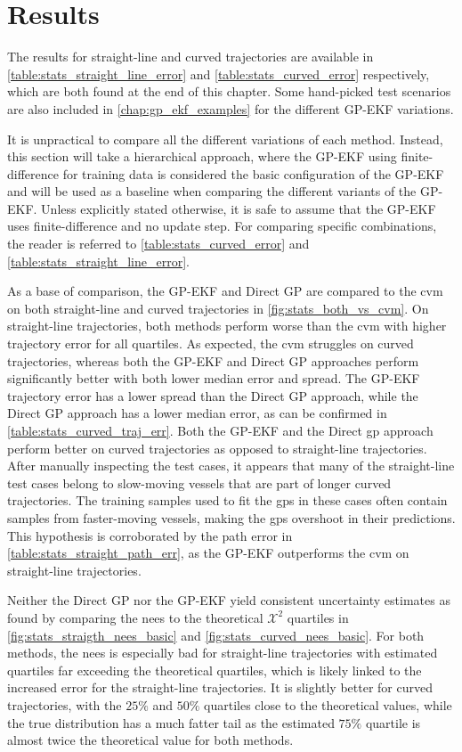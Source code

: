 \section{Results}
The results for straight-line and curved trajectories are available in \cref{table:stats_straight_line_error} and \cref{table:stats_curved_error} respectively, which are both found at the end of this chapter. Some hand-picked test scenarios are also included in \cref{chap:gp_ekf_examples} for the different GP-EKF variations.

It is unpractical to compare all the different variations of each method. Instead, this section will take a hierarchical approach, where the GP-EKF using finite-difference for training data is considered the basic configuration of the GP-EKF and will be used as a baseline when comparing the different variants of the GP-EKF. Unless explicitly stated otherwise, it is safe to assume that the GP-EKF uses finite-difference and no update step. For comparing specific combinations, the reader is referred to \cref{table:stats_curved_error} and \cref{table:stats_straight_line_error}.

As a base of comparison, the GP-EKF and Direct GP are compared to the \acrshort{cvm} on both straight-line and curved trajectories in \cref{fig:stats_both_vs_cvm}. On straight-line trajectories, both methods perform worse than the \acrshort{cvm} with higher trajectory error for all quartiles. As expected, the \acrshort{cvm} struggles on curved trajectories, whereas both the GP-EKF and Direct GP approaches perform significantly better with both lower median error and spread. The GP-EKF trajectory error has a lower spread than the Direct GP approach, while the Direct GP approach has a lower median error, as can be confirmed in \cref{table:stats_curved_traj_err}. Both the GP-EKF and the Direct \acrshort{gp} approach perform better on curved trajectories as opposed to straight-line trajectories. After manually inspecting the test cases, it appears that many of the straight-line test cases belong to slow-moving vessels that are part of longer curved trajectories.  The training samples used to fit the \acrshort{gp}s in these cases often contain samples from faster-moving vessels, making the \acrshort{gp}s overshoot in their predictions. This hypothesis is corroborated by the path error in \cref{table:stats_straight_path_err}, as the GP-EKF outperforms the \acrshort{cvm} on straight-line trajectories.

Neither the Direct GP nor the GP-EKF yield consistent uncertainty estimates as found by comparing the \acrshort{nees} to the theoretical $\mathcal{X}^2$ quartiles in \cref{fig:stats_straigth_nees_basic} and \cref{fig:stats_curved_nees_basic}. For both methods, the \acrshort{nees} is especially bad for straight-line trajectories with estimated quartiles far exceeding the theoretical quartiles, which is likely linked to the increased error for the straight-line trajectories. It is slightly better for curved trajectories, with the $25\%$ and $50\%$ quartiles close to the theoretical values, while the true distribution has a much fatter tail as the estimated $75\%$ quartile is almost twice the theoretical value for both methods.

